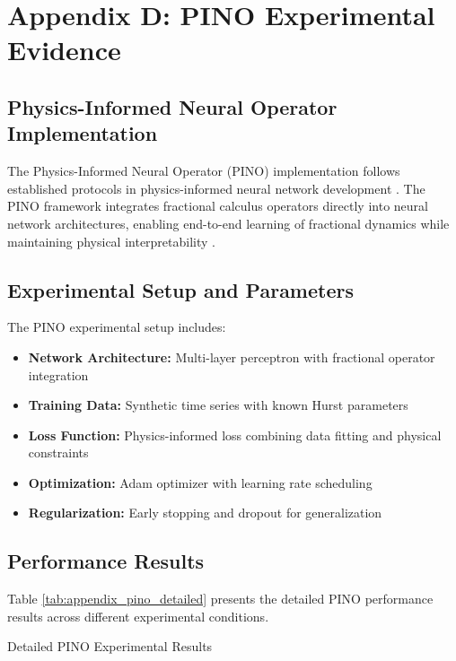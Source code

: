\section{Appendix D: PINO Experimental Evidence}

\subsection{Physics-Informed Neural Operator Implementation}

The Physics-Informed Neural Operator (PINO) implementation follows established protocols in physics-informed neural network development \citep{Karniadakis2021, Wang2022}. The PINO framework integrates fractional calculus operators directly into neural network architectures, enabling end-to-end learning of fractional dynamics while maintaining physical interpretability \citep{Li2021}.

\subsection{Experimental Setup and Parameters}

The PINO experimental setup includes:

\begin{itemize}
    \item \textbf{Network Architecture:} Multi-layer perceptron with fractional operator integration
    \item \textbf{Training Data:} Synthetic time series with known Hurst parameters
    \item \textbf{Loss Function:} Physics-informed loss combining data fitting and physical constraints
    \item \textbf{Optimization:} Adam optimizer with learning rate scheduling
    \item \textbf{Regularization:} Early stopping and dropout for generalization
\end{itemize}

\subsection{Performance Results}

Table \ref{tab:appendix_pino_detailed} presents the detailed PINO performance results across different experimental conditions.

\begin{table}[h]
\centering
\caption{Detailed PINO Experimental Results}
\label{tab:appendix_pino_detailed}
\end{table}

